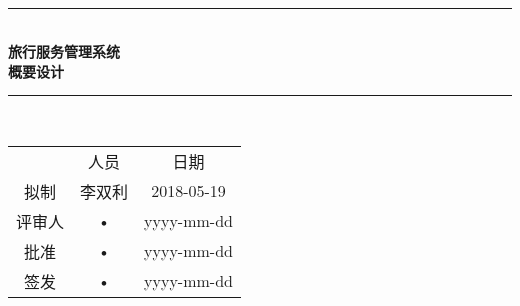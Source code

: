 \documentclass[bachelor]{ustcthesis}
\newcommand{\HRule}{\rule{\linewidth}{0.5mm}}
\begin{document}
\begin{titlepage}
\begin{center}
~\\[5cm]
\HRule \\[0.4cm]
{\huge \bfseries 旅行服务管理系统\\概要设计}\\[0.4cm]
\HRule \\[1.5cm]

\begin{tabular}{ccc}
  & 人员 & 日期 \\ 
拟制 & 李双利 & 2018-05-19 \\ 
评审人 & • & yyyy-mm-dd \\ 
批准 & • & yyyy-mm-dd \\ 
签发 & • & yyyy-mm-dd \\ 
\end{tabular} 

\end{center}
\end{titlepage}



\frontmatter

\tableofcontents
\listoffigures
\listoftables
% 

\mainmatter











% 
% 
% 
% 
% 

\end{document}
